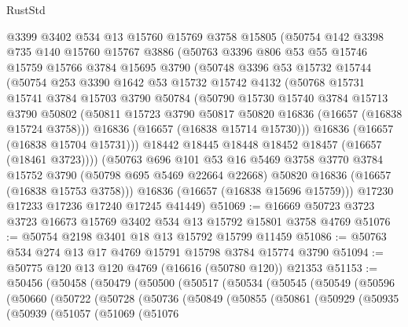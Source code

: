 \begin{lexlean}{RustStd}
\begin{coremodule}
    @3399
    @3402
    @534
    @13
    @15760
    @15769
    @3758
    @15805
    (@50754
      @142
      @3398
      @735
      @140
      @15760
      @15767
      @3886
      (@50763
        @3396
        @806
        @53
        @55
        @15746
        @15759
        @15766
        @3784
        @15695
        @3790
        (@50748
          @3396
          @53
          @15732
          @15744
          (@50754
            @253
            @3390
            @1642
            @53
            @15732
            @15742
            @4132
            (@50768
              @15731
              @15741
              @3784
              @15703
              @3790
              @50784
              (@50790
                @15730
                @15740
                @3784
                @15713
                @3790
                @50802
                (@50811 @15723 @3790 @50817 @50820 @16836 (@16657 (@16838 @15724 @3758)))
                @16836
                (@16657 (@16838 @15714 @15730)))
              @16836
              (@16657 (@16838 @15704 @15731)))
            @18442
            @18445
            @18448
            @18452
            @18457
            (@16657 (@18461 @3723))))
        (@50763
          @696
          @101
          @53
          @16
          @5469
          @3758
          @3770
          @3784
          @15752
          @3790
          (@50798 @695 @5469 @22664 @22668)
          @50820
          @16836
          (@16657 (@16838 @15753 @3758)))
        @16836
        (@16657 (@16838 @15696 @15759)))
      @17230
      @17233
      @17236
      @17240
      @17245
      @41449)
@51069 := @16669 @50723 @3723 @3723 @16673 @15769 @3402 @534 @13 @15792 @15801 @3758 @4769
@51076 := @50754 @2198 @3401 @18 @13 @15792 @15799 @11459
@51086 := @50763 @534 @274 @13 @17 @4769 @15791 @15798 @3784 @15774 @3790
@51094 := @50775 @120 @13 @120 @4769 (@16616 (@50780 @120)) @21353
@51153 := @50456
    (@50458
      (@50479
        (@50500
          (@50517
            (@50534
              (@50545
                (@50549
                  (@50596
                    (@50660
                      (@50722
                        (@50728
                          (@50736
                            (@50849
                              (@50855
                                (@50861
                                  (@50929
                                    (@50935
                                      (@50939
                                        (@51057
                                          (@51069
                                            (@51076

\end{coremodule}
\end{lexlean}
